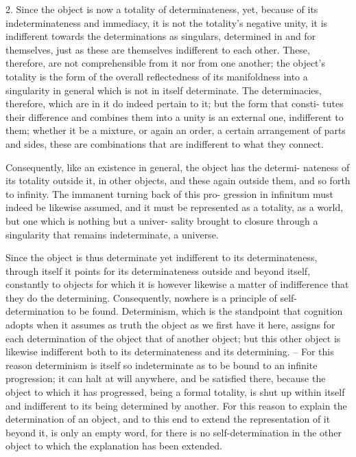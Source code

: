 2. Since the object is now a totality of determinateness, yet, because of
its indeterminateness and immediacy, it is not the totality's negative unity,
it is indifferent towards the determinations as singulars, determined in and
for themselves, just as these are themselves indifferent to each other. These,
therefore, are not comprehensible from it nor from one another; the object's
totality is the form of the overall reflectedness of its manifoldness into a
singularity in general which is not in itself determinate. The determinacies,
therefore, which are in it do indeed pertain to it; but the form that consti-
tutes their difference and combines them into a unity is an external one,
indifferent to them; whether it be a mixture, or again an order, a certain
arrangement of parts and sides, these are combinations that are indifferent
to what they connect.

Consequently, like an existence in general, the object has the determi-
nateness of its totality outside it, in other objects, and these again outside
them, and so forth to infinity. The immanent turning back of this pro-
gression in infinitum must indeed be likewise assumed, and it must be
represented as a totality, as a world, but one which is nothing but a univer-
sality brought to closure through a singularity that remains indeterminate,
a universe.

Since the object is thus determinate yet indifferent to its determinateness,
through itself it points for its determinateness outside and beyond itself,
constantly to objects for which it is however likewise a matter of indifference
that they do the determining. Consequently, nowhere is a principle of self-
determination to be found. Determinism, which is the standpoint that
cognition adopts when it assumes as truth the object as we first have it
here, assigns for each determination of the object that of another object;
but this other object is likewise indifferent both to its determinateness and
its determining. – For this reason determinism is itself so indeterminate as
to be bound to an infinite progression; it can halt at will anywhere, and be
satisfied there, because the object to which it has progressed, being a formal
totality, is shut up within itself and indifferent to its being determined by
another. For this reason to explain the determination of an object, and
to this end to extend the representation of it beyond it, is only an empty
word, for there is no self-determination in the other object to which the
explanation has been extended.

